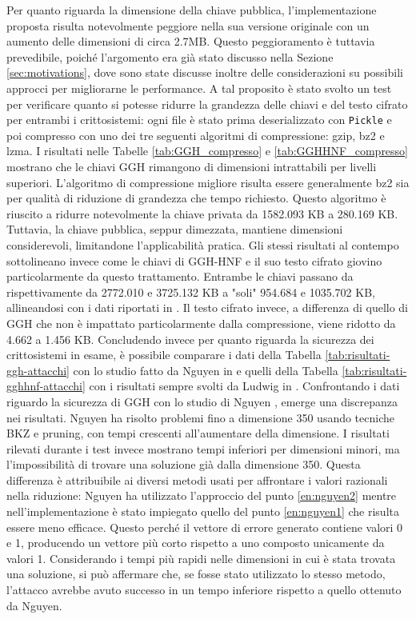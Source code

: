 Per quanto riguarda la dimensione della chiave pubblica, l'implementazione proposta risulta
notevolmente peggiore nella sua versione originale con un aumento delle dimensioni di 
circa 2.7MB. Questo peggioramento è tuttavia prevedibile, poiché l'argomento era già 
stato discusso nella Sezione \ref{sec:motivations}, dove sono state discusse inoltre delle 
considerazioni su possibili approcci per migliorarne le performance. A tal proposito è
stato svolto un test per verificare quanto si potesse ridurre la grandezza delle chiavi e 
del testo cifrato per entrambi i crittosistemi: ogni file è stato prima deserializzato con 
\texttt{Pickle} e poi compresso con uno dei tre seguenti algoritmi di compressione: 
gzip, bz2 e lzma. 
I risultati nelle Tabelle \ref{tab:GGH_compresso} e \ref{tab:GGHHNF_compresso} mostrano 
che le chiavi GGH rimangono di dimensioni intrattabili per livelli superiori. 
L'algoritmo di compressione migliore risulta essere generalmente bz2 sia per qualità di 
riduzione di grandezza che tempo richiesto. 
Questo algoritmo è riuscito a ridurre notevolmente la chiave privata da 1582.093 KB a 
280.169 KB. Tuttavia, la chiave pubblica, seppur dimezzata, mantiene dimensioni 
considerevoli, limitandone l'applicabilità pratica. Gli stessi risultati al contempo 
sottolineano invece come le chiavi di GGH-HNF e il suo testo cifrato giovino 
particolarmente da questo trattamento. Entrambe le chiavi passano da rispettivamente da
2772.010 e 3725.132 KB a "soli" 954.684 e 1035.702 KB, allineandosi con i dati riportati in 
\cite{HNF04}. Il testo cifrato invece, a differenza di quello di GGH che non è impattato 
particolarmente dalla compressione, viene ridotto da 4.662 a 1.456 KB. 
Concludendo invece per quanto riguarda la sicurezza dei crittosistemi in esame, è possibile
comparare i dati della Tabella \ref{tab:risultati-ggh-attacchi} con lo studio fatto da
Nguyen in \cite{Nguyen99} e quelli della Tabella \ref{tab:risultati-gghhnf-attacchi} con 
i risultati sempre svolti da Ludwig in \cite{HNF04}. 
Confrontando i dati riguardo la sicurezza di GGH con lo studio di Nguyen \cite{Nguyen99}, 
emerge una discrepanza nei risultati. Nguyen ha risolto problemi fino a dimensione 
350 usando tecniche BKZ e pruning, con tempi crescenti all'aumentare della dimensione.
I risultati rilevati durante i test invece mostrano tempi inferiori per dimensioni minori, 
ma l'impossibilità di trovare una soluzione già dalla dimensione 350.
Questa differenza è attribuibile ai diversi metodi usati per affrontare i valori 
razionali nella riduzione: Nguyen ha utilizzato l'approccio del punto \ref{en:nguyen2} 
mentre nell'implementazione è stato impiegato quello del punto \ref{en:nguyen1} che risulta 
essere meno efficace. Questo perché il vettore di errore generato contiene valori 0 e 1, 
producendo un vettore più corto rispetto a uno composto unicamente da valori 1. 
Considerando i tempi più rapidi nelle dimensioni in cui è stata trovata una soluzione, 
si può affermare che, se fosse stato utilizzato lo stesso metodo, l'attacco avrebbe avuto 
successo in un tempo inferiore rispetto a quello ottenuto da Nguyen. 

